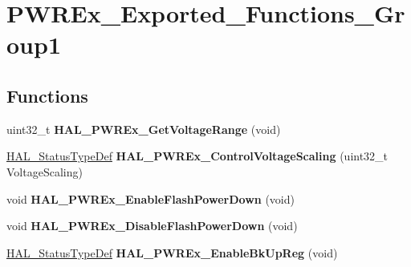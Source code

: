 \hypertarget{group___p_w_r_ex___exported___functions___group1}{}\section{P\+W\+R\+Ex\+\_\+\+Exported\+\_\+\+Functions\+\_\+\+Group1}
\label{group___p_w_r_ex___exported___functions___group1}
\subsection*{Functions}
\begin{DoxyCompactItemize}
\item 
\mbox{\label{group___p_w_r_ex___exported___functions___group1_ga2978c7160c8d166f1bf2bf39e4bf33f7}} 
uint32\+\_\+t {\bfseries H\+A\+L\+\_\+\+P\+W\+R\+Ex\+\_\+\+Get\+Voltage\+Range} (void)
\item 
\mbox{\label{group___p_w_r_ex___exported___functions___group1_ga1a1e616641c2dc696681ace585d9afb5}} 
\mbox{\hyperlink{stm32f7xx__hal__def_8h_a63c0679d1cb8b8c684fbb0632743478f}{H\+A\+L\+\_\+\+Status\+Type\+Def}} {\bfseries H\+A\+L\+\_\+\+P\+W\+R\+Ex\+\_\+\+Control\+Voltage\+Scaling} (uint32\+\_\+t Voltage\+Scaling)
\item 
\mbox{\label{group___p_w_r_ex___exported___functions___group1_ga86c72a23f89c3c335ab784f42536b106}} 
void {\bfseries H\+A\+L\+\_\+\+P\+W\+R\+Ex\+\_\+\+Enable\+Flash\+Power\+Down} (void)
\item 
\mbox{\label{group___p_w_r_ex___exported___functions___group1_ga12385932ad48ece7fde94d5c3db5cd19}} 
void {\bfseries H\+A\+L\+\_\+\+P\+W\+R\+Ex\+\_\+\+Disable\+Flash\+Power\+Down} (void)
\item 
\mbox{\label{group___p_w_r_ex___exported___functions___group1_ga21165778ccc2144040c6a935c9f794a7}} 
\mbox{\hyperlink{stm32f7xx__hal__def_8h_a63c0679d1cb8b8c684fbb0632743478f}{H\+A\+L\+\_\+\+Status\+Type\+Def}} {\bfseries H\+A\+L\+\_\+\+P\+W\+R\+Ex\+\_\+\+Enable\+Bk\+Up\+Reg} (void)
\item 

\end{DoxyCompactItemize}
